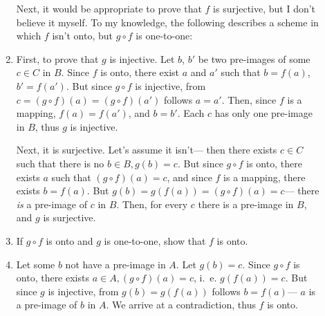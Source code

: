 \begin{description}
\begin{enumerate}
Next, it would be appropriate to prove that $f$ is surjective, but I don't
believe it myself. To my knowledge, the following describes a scheme in which
$f$ isn't onto, but $g \circ f$ is one-to-one:

\begin{center}
\end{center}

\item First, to prove that $g$ is injective. Let $b$, $b'$ be two pre-images of
some $c \in C$ in $B$. Since $f$ is onto, there exist $a$ and $a'$ such that $b
= f(a)$, $b' = f(a')$. But since $g \circ f$ is injective, from $c = (g \circ
f)(a) = (g \circ f)(a')$ follows $a = a'$. Then, since $f$ is a mapping, $f(a)
= f(a')$, and $b = b'$. Each $c$ has only one pre-image in $B$, thus $g$ is
injective.

Next, it is surjective. Let's assume it isn't--- then there exists $c \in C$
such that there is no $b \in B, g(b) = c$. But since $g \circ f$ is onto,
there exists $a$ such that $(g \circ f)(a) = c$, and since $f$ is a mapping,
there exists $b = f(a)$. But $g(b) = g(f(a)) = (g \circ f)(a) = c$--- there
\textit{is} a pre-image of $c$ in $B$. Then, for every $c$ there is a pre-image
in $B$, and $g$ is surjective.

\item If $g \circ f$ is onto and $g$ is one-to-one, show that $f$ is onto.
\item Let some $b$ not have a pre-image in $A$. Let $g(b) = c$. Since
$g \circ f$ is onto, there exists $a \in A, (g \circ f)(a) = c$, i.\ e.
$g (f(a)) = c$. But since $g$ is injective, from $g(b) = g(f(a))$ follows
$b = f(a)$--- $a$ is a pre-image of $b$ in $A$. We arrive at a contradiction,
thus $f$ is onto.

\end{enumerate}
\end{description}

